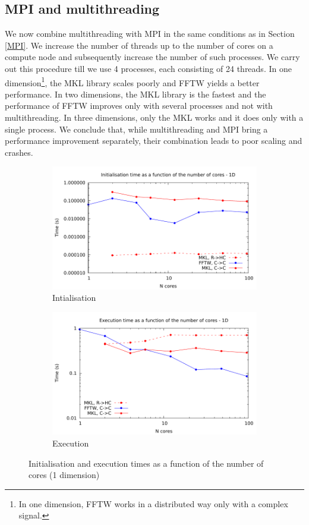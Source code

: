 \documentclass[12pt, a4paper]{article}
\begin{document}
\subsection{MPI and multithreading}\label{MPIMULTH}
We now combine multithreading with MPI in the same conditions as in Section \ref{MPI}. We increase the number of threads up to the number of cores on a compute node and subsequently increase the number of such processes. We carry out this procedure till we use 4 processes, each consisting of 24 threads. In one dimension\footnote{In one dimension, FFTW works in a distributed way only with a complex signal.}, the MKL library scales poorly and FFTW yields a better performance. In two dimensions, the MKL library is the fastest and the performance of FFTW improves only with several processes and not with multithreading. In three dimensions, only the MKL works and it does only with a single process. We conclude that, while multithreading and MPI bring a performance improvement separately, their combination leads to poor scaling and crashes. 
\begin{figure}[H]
\captionsetup{width=0.8\linewidth}
\centering
\begin{subfigure}{.5\textwidth}
\centering
\includegraphics[width=.9\linewidth]{graphs/mpi-multh-init-1d.pdf}
\caption{Intialisation}
\label{1DMPIMULTHI}
\end{subfigure}%
\begin{subfigure}{.5\textwidth}
\centering
\includegraphics[width=.9\linewidth]{graphs/mpi-multh-exec-1d.pdf}
\caption{Execution}
\label{1DMPIMULTHE}
\end{subfigure}
\caption{Initialisation and execution times as a function of the number of cores (1 dimension)}
\label{1DMPIMULTH}
\end{figure}
\end{document}
